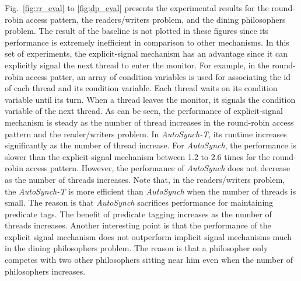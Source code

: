 \documentclass{sigplanconf}
\begin{document}
Fig.~\ref{fig:rr_eval} to \ref{fig:dp_eval} presents the experimental results for
the round-robin access pattern, the readers/writers problem, %
and the dining philosophers problem. The result of the
baseline is not plotted in these figures since its performance is extremely
inefficient in comparison to other mechanisms.  In this set of experiments, 
the explicit-signal mechanism has an advantage since it can explicitly signal 
the next thread to enter the monitor. For example, in the round-robin access
patter, an array of condition variables is used for associating the id of each
thread and its condition variable. Each thread waits on its condition variable
until its turn. When a thread leaves the monitor, it signals the condition 
variable of the next thread. As can be seen, the performance of 
explicit-signal mechanism is steady as the number of thread increases in
the round-robin access pattern and the reader/writers problem. In 
{\em AutoSynch-T}, its runtime increases significantly as the 
number of thread increase. For {\em AutoSynch}, the performance is slower than 
the explicit-signal mechanism between 1.2 to 2.6 times for the round-robin access
pattern. However, the performance of {\em AutoSynch} does not decrease as the 
number of threads increases. Note that, in the readers/writers problem, the
{\em AutoSynch-T} is more efficient than {\em AutoSynch} when the number of
threads is small. The reason is that {\em AutoSynch} sacrifices performance for
maintaining predicate tags. The benefit of predicate tagging increases as the
number of threads increases. Another interesting point is that the
performance of the explicit signal mechanism does not outperform implicit
signal mechanisms much in the dining philosophers problem. The reason is that
a philosopher only competes with two other philosophers sitting near him even
when the number of philosophers increases. 
\end{document}
